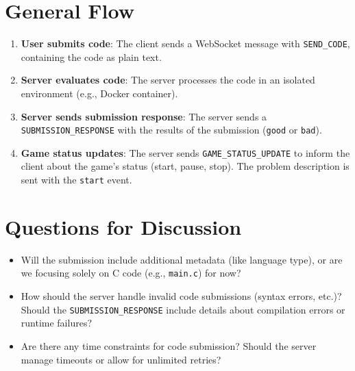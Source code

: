 \documentclass{article}
\begin{document}
\section{General Flow}

\begin{enumerate}
    \item \textbf{User submits code}: The client sends a WebSocket message with \texttt{SEND\_CODE}, containing the code as plain text.
    \item \textbf{Server evaluates code}: The server processes the code in an isolated environment (e.g., Docker container).
    \item \textbf{Server sends submission response}: The server sends a \texttt{SUBMISSION\_RESPONSE} with the results of the submission (\texttt{good} or \texttt{bad}).
    \item \textbf{Game status updates}: The server sends \texttt{GAME\_STATUS\_UPDATE} to inform the client about the game’s status (start, pause, stop). The problem description is sent with the \texttt{start} event.
\end{enumerate}

\section{Questions for Discussion}

\begin{itemize}
    \item Will the submission include additional metadata (like language type), or are we focusing solely on C code (e.g., \texttt{main.c}) for now?
    \item How should the server handle invalid code submissions (syntax errors, etc.)? Should the \texttt{SUBMISSION\_RESPONSE} include details about compilation errors or runtime failures?
    \item Are there any time constraints for code submission? Should the server manage timeouts or allow for unlimited retries?
\end{itemize}
\end{document}
